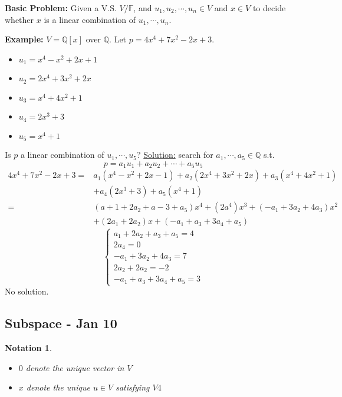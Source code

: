 \documentclass[12pt]{article}
\newtheorem{notation}{Notation}[subsection]
\begin{document}
	{\color{Brown}
	\textbf{Basic Problem: }
	Given a V.S. $V/\mathbb{F}$, and $u_1, u_2, \cdots,u_n \in V$ and $x\in V$
	to decide whether $x$ is a linear combination of $u_1,\cdots, u_n$.
	
	\textbf{Example: }
	$V = \mathbb{Q}[x]$ over $\mathbb{Q}$. Let $p = 4x^4 + 7x^2 -2x+3$. 
	\begin{itemize}
		\item $u_1 = x^4 - x^2 + 2x + 1$
		\item $u_2 = 2x^4 + 3x^2 + 2x$
		\item $u_3 = x^4 + 4x^2 + 1$
		\item $u_4 = 2x^3 + 3$
		\item $u_5 = x^4 + 1$
	\end{itemize}
	Is $p$ a linear combination of $u_1, \cdots, u_5$?
	\underline{Solution:} search for $a_1,\cdots,a_5 \in \mathbb{Q}$ s.t. 
	\[
		p = a_1 u_1+a_2u_2+\cdots+a_5u_5
	\]
	\begin{align*}
		4x^4+7x^2-2x+3 
		=& a_1(x^4-x^2+2x-1)+a_2(2x^4+3x^2+2x)+a_3(x^4+4x^2+1)\\
		 &+a_4(2x^3+3)+a_5(x^4+1)\\
		=& (a+1+2a_2+a-3+a_5)x^4+(2a^4)x^3+(-a_1+3a_2+4a_3)x^2\\
		 &+(2a_1+2a_2)x	+(-a_1+a_3+3a_4+a_5)
	\end{align*}
	\[
		\begin{cases}
			a_1+2a_2+a_3+a_5 = 4\\
			2a_4=0\\
			-a_1+3a_2+4a_3 = 7\\
			2a_2+2a_2=-2\\
			-a_1+a_3+3a_4+a_5=3
		\end{cases}
	\]
	No solution. 

	}




	\newpage
	\subsection{Subspace - Jan 10}
	\begin{notation}
		$ $
		\begin{itemize}
			\item 	$0$ denote the unique vector in $V$
			\item 	$x$ denote the unique $u\in V$ satisfying $V4$ \\
		\end{itemize}
	\end{notation}
\end{document}
